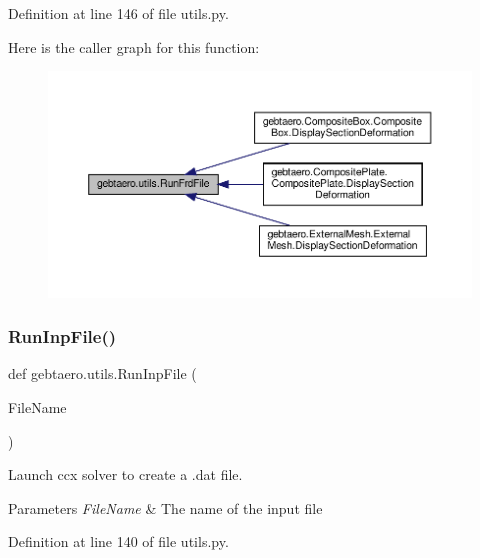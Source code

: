 Definition at line 146 of file utils.\+py.

Here is the caller graph for this function\+:
\nopagebreak
\begin{figure}[H]
\begin{center}
\leavevmode
\includegraphics[width=350pt]{namespacegebtaero_1_1utils_a553253bef10c3bec37dc0d858b03dc71_icgraph}
\end{center}
\end{figure}
\mbox{\label{namespacegebtaero_1_1utils_a74be96ae0691643c4e6c459e14360464}} 
\subsubsection{\texorpdfstring{Run\+Inp\+File()}{RunInpFile()}}
{\footnotesize\ttfamily def gebtaero.\+utils.\+Run\+Inp\+File (\begin{DoxyParamCaption}\item[{}]{File\+Name }\end{DoxyParamCaption})}



Launch ccx solver to create a .dat file. 


\begin{DoxyParams}{Parameters}
{\em File\+Name} & The name of the input file \\
\hline
\end{DoxyParams}


Definition at line 140 of file utils.\+py.

